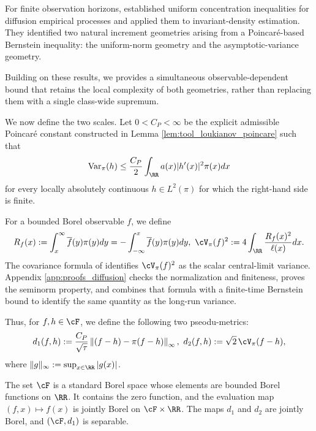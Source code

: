\documentclass[11pt]{article}
\begin{document}
For finite observation horizons, \citet{aeckerle2021concentration}
established uniform concentration inequalities for diffusion empirical
processes and applied them to invariant-density estimation. They
identified two natural increment geometries arising from a
Poincar\'e-based Bernstein inequality: the uniform-norm geometry and the asymptotic-variance geometry. 

Building on these results, we provides a simultaneous observable-dependent bound that retains the local
complexity of both geometries, rather than replacing them with a single
class-wide supremum.

We now define the two scales. Let $0<C_P<\infty$ be the explicit
admissible Poincar\'e constant constructed in Lemma
\ref{lem:tool_loukianov_poincare} such that
\begin{align}
\operatorname{Var}_\pi(h)
\le
\frac{C_P}{2}
\int_{\RR}a(x)|h'(x)|^2\pi(x)dx
\label{eq:diffusion_poincare}
\end{align}
for every locally absolutely continuous $h\in L^2(\pi)$ for which the
right-hand side is finite.

For a bounded Borel observable $f$, we define
\begin{align*}
R_f(x):=
\int_x^\infty\overline f(y)\pi(y)dy
=
-\int_{-\infty}^x\overline f(y)\pi(y)dy,\ \cV_\pi(f)^2
:=
4\int_{\RR}\frac{R_f(x)^2}{\ell(x)}dx.
\end{align*}
The covariance formula of \citet{vandervaart2005donsker} identifies
$\cV_\pi(f)^2$ as the scalar central-limit variance. Appendix
\ref{app:proofs_diffusion} checks the normalization and finiteness, proves
the seminorm property, and combines that formula with a finite-time
Bernstein bound to identify the same quantity as the long-run variance.

Thus, for $f,h\in\cF$, we define the following two pseodu-metrics:
\begin{align*}
d_1(f,h)
:=
\frac{C_P}{\sqrt\tau}
\left\|(f-h)-\pi(f-h)\right\|_\infty,\ 
d_2(f,h):=
\sqrt2\,\cV_\pi(f-h),
\end{align*}
where $\|g\|_\infty:=\sup_{x\in\RR}|g(x)|$.

\begin{assumption}
\label{ass:diffusion_index_class}
The set $\cF$ is a standard Borel space whose elements are bounded Borel
functions on $\RR$. It contains the zero function, and the evaluation map
$(f,x)\mapsto f(x)$ is jointly Borel on $\cF\times\RR$. The maps $d_1$
and $d_2$ are jointly Borel, and $(\cF,d_1)$ is separable.
\end{assumption}
\end{document}
